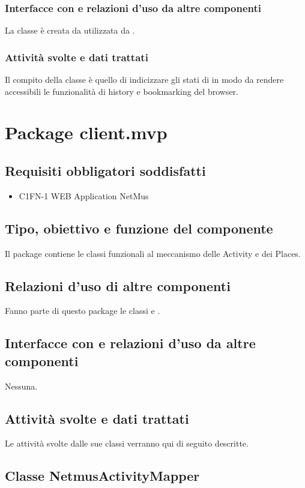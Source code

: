 \subsubsection*{Interfacce con e relazioni d'uso da altre componenti}
La classe \`e creata da  utilizzata da .
\subsubsection*{Attivit\`a svolte e dati trattati}
Il compito della classe \`e quello di indicizzare gli stati di
 in modo da rendere accessibili le funzionalit\`a di
history e bookmarking del browser.


\newpage
\section{Package client.mvp} %
\subsection*{Requisiti obbligatori soddisfatti}
\begin{itemize}
	\item C1FN-1 WEB Application NetMus
\end{itemize}
\subsection*{Tipo, obiettivo e funzione del componente}
Il package contiene le classi funzionali al meccanismo delle Activity e dei
Places.
\subsection*{Relazioni d'uso di altre componenti}
Fanno parte di questo package le classi  e
.
\subsection*{Interfacce con e relazioni d'uso da altre componenti}
Nessuna.
\subsection*{Attivit\`a svolte e dati trattati}
Le attivit\`a svolte dalle sue classi verranno qui di seguito descritte.

\subsection{Classe NetmusActivityMapper}
